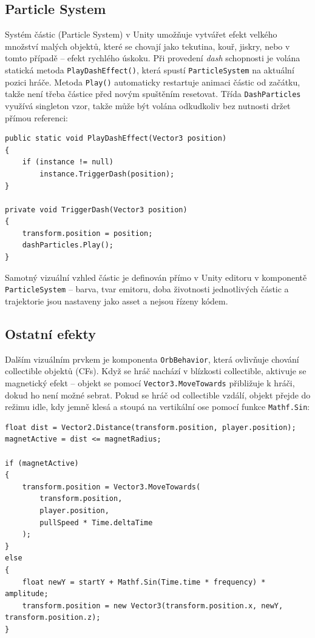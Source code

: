 \subsection{Particle System}
\label{sec:particle-system}

Systém částic (Particle System) v Unity umožňuje vytvářet efekt velkého množství malých objektů, které se chovají jako tekutina, kouř, jiskry, nebo v tomto případě -- efekt rychlého úskoku. Při provedení \emph{dash} schopnosti je volána statická metoda \texttt{PlayDashEffect()}, která spustí \texttt{ParticleSystem} na aktuální pozici hráče. Metoda \texttt{Play()} automaticky restartuje animaci částic od začátku, takže není třeba částice před novým spuštěním resetovat. Třída \texttt{DashParticles} využívá singleton vzor, takže může být volána odkudkoliv bez nutnosti držet přímou referenci:

\begin{lstlisting}[caption={DashParticles -- spuštění částic}, label={lst:dash-particles}]
public static void PlayDashEffect(Vector3 position)
{
    if (instance != null)
        instance.TriggerDash(position);
}

private void TriggerDash(Vector3 position)
{
    transform.position = position;
    dashParticles.Play();
}
\end{lstlisting}

Samotný vizuální vzhled částic je definován přímo v Unity editoru v komponentě \texttt{ParticleSystem} -- barva, tvar emitoru, doba životnosti jednotlivých částic a trajektorie jsou nastaveny jako asset a nejsou řízeny kódem.

\subsection{Ostatní efekty}
\label{sec:ostatni-efekty-vfx}

Dalším vizuálním prvkem je komponenta \texttt{OrbBehavior}, která ovlivňuje chování collectible objektů (CFs). Když se hráč nachází v blízkosti collectible, aktivuje se magnetický efekt -- objekt se pomocí \texttt{Vector3.MoveTowards} přibližuje k hráči, dokud ho není možné sebrat. Pokud se hráč od collectible vzdálí, objekt přejde do režimu idle, kdy jemně klesá a stoupá na vertikální ose pomocí funkce \texttt{Mathf.Sin}:

\begin{lstlisting}[caption={OrbBehavior -- magnet a idle animace}, label={lst:orb-behavior}]
float dist = Vector2.Distance(transform.position, player.position);
magnetActive = dist <= magnetRadius;

if (magnetActive)
{
    transform.position = Vector3.MoveTowards(
        transform.position,
        player.position,
        pullSpeed * Time.deltaTime
    );
}
else
{
    float newY = startY + Mathf.Sin(Time.time * frequency) * amplitude;
    transform.position = new Vector3(transform.position.x, newY, transform.position.z);
}
\end{lstlisting}

